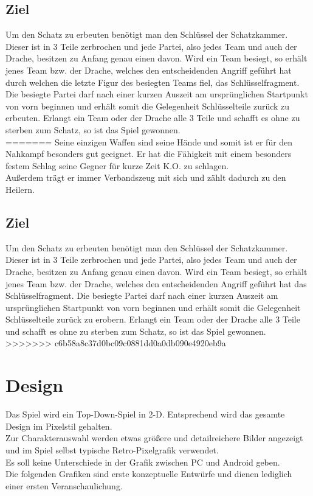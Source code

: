 \documentclass[10pt,a4paper,notitlepage]{report}
\begin{document}
\begin{flushleft}
\section{Ziel}
Um den Schatz zu erbeuten benötigt man den Schlüssel der Schatzkammer. Dieser ist in 3 Teile zerbrochen und jede Partei, also jedes Team und auch der Drache, besitzen zu Anfang genau einen davon. Wird ein Team besiegt, so erhält jenes Team bzw. der Drache, welches den entscheidenden Angriff geführt hat durch welchen die letzte Figur des besiegten Teams fiel, das Schlüsselfragment. Die besiegte Partei darf nach einer kurzen Auszeit am ursprünglichen Startpunkt von vorn beginnen und erhält somit die Gelegenheit Schlüsselteile zurück zu erbeuten. Erlangt ein Team oder der Drache alle 3 Teile und schafft es ohne zu sterben zum Schatz, so ist das Spiel gewonnen.\\
=======
Seine einzigen Waffen sind seine Hände und somit ist er für den Nahkampf besonders gut geeignet. Er hat die Fähigkeit mit einem besonders festem Schlag seine Gegner für kurze Zeit K.O. zu schlagen.\\
Außerdem trägt er immer Verbandszeug mit sich und zählt dadurch zu den Heilern.\\
\section{Ziel}
Um den Schatz zu erbeuten benötigt man den Schlüssel der Schatzkammer. Dieser ist in 3 Teile zerbrochen und jede Partei, also jedes Team und auch der Drache, besitzen zu Anfang genau einen davon. Wird ein Team besiegt, so erhält jenes Team bzw. der Drache, welches den entscheidenden Angriff geführt hat das Schlüsselfragment. Die besiegte Partei darf nach einer kurzen Auszeit am ursprünglichen Startpunkt von vorn beginnen und erhält somit die Gelegenheit Schlüsselteile zurück zu erobern. Erlangt ein Team oder der Drache alle 3 Teile und schafft es ohne zu sterben zum Schatz, so ist das Spiel gewonnen.\\
>>>>>>> c6b58a8c37d0bc09c0881dd0a0db090e4920eb9a

\chapter{Design}
Das Spiel wird ein Top-Down-Spiel in 2-D. Entsprechend wird das gesamte Design im Pixelstil gehalten.\\
Zur Charakterauswahl werden etwas größere und detailreichere Bilder angezeigt und im Spiel selbst typische Retro-Pixelgrafik verwendet.\\
Es soll keine Unterschiede in der Grafik zwischen PC und Android geben.\\
Die folgenden Grafiken sind erste konzeptuelle Entwürfe und dienen lediglich einer ersten Veranschaulichung.\\


\end{flushleft}
\end{document}
